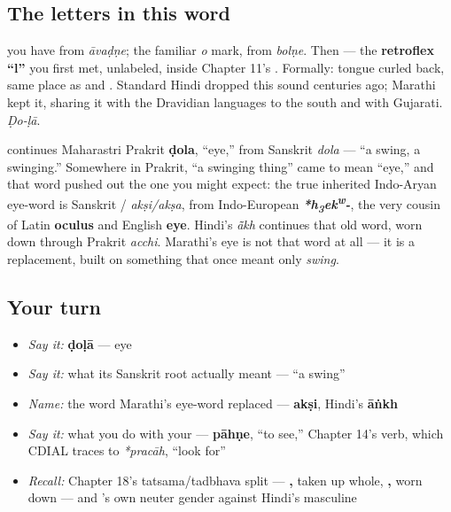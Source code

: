 \subsection*{The letters in this word}
\textbf{} you have from \emph{āvaḍṇe}; \textbf{} the familiar \emph{o} mark, from \emph{bolṇe}. Then \textbf{} — the \textbf{retroflex \textquotedblleft{}l\textquotedblright{}} you first met, unlabeled, inside Chapter 11's \textbf{}. Formally: tongue curled back, same place as \textbf{} and \textbf{}. Standard Hindi dropped this sound centuries ago; Marathi kept it, sharing it with the Dravidian languages to the south and with Gujarati. \emph{Ḍo-ḷā}.

\begin{cousinweb}
\textbf{} continues Maharastri Prakrit \textbf{ḍola}, \textquotedblleft{}eye,\textquotedblright{} from Sanskrit \textbf{} \emph{dola} — \textquotedblleft{}a swing, a swinging.\textquotedblright{} Somewhere in Prakrit, \textquotedblleft{}a swinging thing\textquotedblright{} came to mean \textquotedblleft{}eye,\textquotedblright{} and that word pushed out the one you might expect: the true inherited Indo-Aryan eye-word is Sanskrit \textbf{}/\textbf{} \emph{akṣi/akṣa}, from Indo-European \emph{\textbf{*h\textsubscript{3}ek\textsuperscript{w}-}}, the very cousin of Latin \textbf{oculus} and English \textbf{eye}. Hindi's \textbf{} \emph{ā̃kh} continues that old word, worn down through Prakrit \emph{acchi}. Marathi's eye is not that word at all — it is a replacement, built on something that once meant only \emph{swing}.
\end{cousinweb}

\subsection*{Your turn}
\begin{itemize}
\raggedright
  \item \emph{Say it:} \textbf{ḍoḷā} — eye
  \item \emph{Say it:} what its Sanskrit root actually meant — \textquotedblleft{}a swing\textquotedblright{}
  \item \emph{Name:} the word Marathi's eye-word replaced — \textbf{akṣi}, Hindi's \textbf{āṅkh}
  \item \emph{Say it:} what you do with your \textbf{} — \textbf{pāhṇe}, \textquotedblleft{}to see,\textquotedblright{} Chapter 14's verb, which CDIAL traces to \emph{*pracāh}, \textquotedblleft{}look for\textquotedblright{}
  \item \emph{Recall:} Chapter 18's tatsama/tadbhava split — \textbf{, } taken up whole, \textbf{, } worn down — and \textbf{}'s own neuter gender against Hindi's masculine
\end{itemize}


